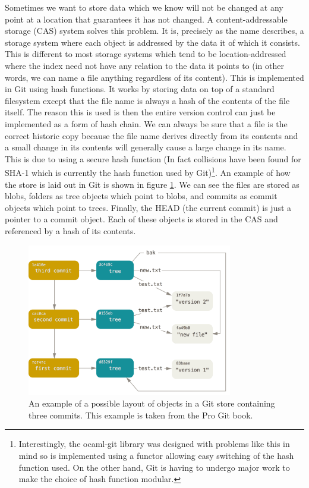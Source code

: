 Sometimes we want to store data which we know will not be changed at any point at a location that guarantees it has not changed. A content-addressable storage (CAS) system solves this problem. It is, precisely as the name describes, a storage system where each object is addressed by the data it of which it consists. This is different to most storage systems which tend to be location-addressed where the index need not have any relation to the data it points to (in other words, we can name a file anything regardless of its content). This is implemented in Git using hash functions. It works by storing data on top of a standard filesystem except that the file name is always a hash of the contents of the file itself. The reason this is used is then the entire version control can just be implemented as a form of hash chain. We can always be sure that a file is the correct historic copy because the file name derives directly from its contents and a small change in its contents will generally cause a large change in its name. This is due to using a secure hash function (In fact collisions have been found for SHA-1 which is currently the hash function used by Git)\footnote{Interestingly, the ocaml-git library was designed with problems like this in mind so is implemented using a functor allowing easy switching of the hash function used. On the other hand, Git is having to undergo major work to make the choice of hash function modular\cite{git_transition}.}. An example of how the store is laid out in Git is shown in figure \ref{fig:gitdatamodel}. We can see the files are stored as blobs, folders as tree objects which point to blobs, and commits as commit objects which point to trees. Finally, the HEAD (the current commit) is just a pointer to a commit object. Each of these objects is stored in the CAS and referenced by a hash of its contents.

\begin{figure}[h]
  \center
  \includegraphics[width=0.8\textwidth]{figs/git-data-model}
  \caption{An example of a possible layout of objects in a Git store containing three commits. This example is taken from the Pro Git book\cite{chacon2014git}.}
  \label{fig:gitdatamodel}
\end{figure}

